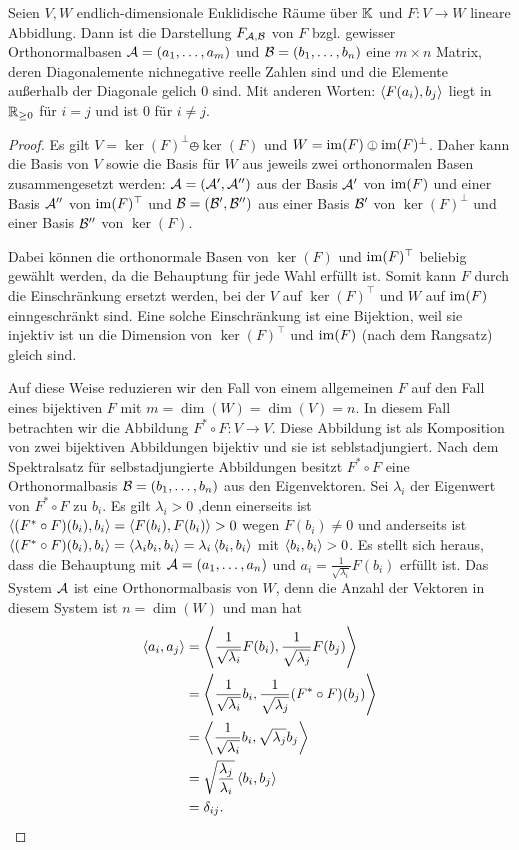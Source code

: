 	\begin{thm}
		Seien $V, W$ endlich-dimensionale Euklidische Räume über $\mathbb K$ und  $F : V \to W$ lineare Abbidlung. Dann ist die Darstellung $F_{\mathcal{A},\mathcal{B}}$ von $F$ bzgl. gewisser Orthonormalbasen $\mathcal{A} = (a_1,\ldots,a_m)$ und $\mathcal{B}= (b_1,\ldots,b_n)$ eine $m \times n$ Matrix, deren Diagonalemente nichnegative reelle Zahlen sind und die Elemente außerhalb der Diagonale gelich $0$ sind. Mit anderen Worten: $\left\langle F(a_i),b_j \right\rangle$ liegt in $\mathbb R_{\ge 0}$ für $i  = j$ und ist $0$ für $i \ne j$. 
	\end{thm}
	\begin{proof}
		Es gilt $V =  \ker(F)^\bot \obot \ker(F)$  und $W = \im(F) \obot \im(F)^\bot$. Daher kann die Basis von $V$ sowie die Basis für $W$ aus jeweils zwei orthonormalen Basen zusammengesetzt werden: $\mathcal{A} = (\mathcal{A}',\mathcal{A}'')$ aus der Basis $\mathcal{A}'$ von $\operatorname{im}(F)$ und einer Basis $\mathcal{A}''$ von $\operatorname{im}(F)^\top$ und $\mathcal{B}=(\mathcal{B}', \mathcal{B}'')$ aus einer Basis $\mathcal{B}'$ von $\ker(F)^\bot$ und einer Basis $\mathcal{B}''$ von $\ker(F)$. 
		
		Dabei können die orthonormale Basen von $\ker(F)$ und $\operatorname{im}(F)^\top$ beliebig gewählt werden, da die Behauptung für jede Wahl erfüllt ist. Somit kann $F$ durch die Einschränkung ersetzt werden, bei der $V$ auf $\ker(F)^\top$ und $W$ auf $\operatorname{im}(F)$ einngeschränkt sind. Eine solche Einschränkung ist eine Bijektion, weil sie injektiv ist un die Dimension von $\ker(F)^\top$ und $\operatorname{im}(F)$ (nach dem Rangsatz) gleich sind. 
		
		Auf diese Weise reduzieren wir den Fall von einem allgemeinen $F$ auf den Fall eines bijektiven $F$ mit $m = \dim(W) = \dim(V) =n$. In diesem Fall betrachten wir die Abbildung $F^\ast \circ F : V \to V$. Diese Abbildung ist als Komposition von zwei bijektiven Abbildungen bijektiv und sie ist seblstadjungiert. Nach dem Spektralsatz für selbstadjungierte Abbildungen besitzt $F^\ast \circ F$ eine Orthonormalbasis $\mathcal{B} = (b_1,\ldots,b_n)$  aus den Eigenvektoren. Sei $\lambda_i$ der Eigenwert von $F^\ast \circ F$ zu $b_i$. Es gilt $\lambda_i> 0$ ,denn einerseits ist $\left\langle  (F^\ast \circ F)(b_i), b_i  \right\rangle = \left\langle  F(b_i), F(b_i) \right\rangle > 0$ wegen $F(b_i) \ne 0$ und anderseits ist $\left\langle  (F^\ast \circ F)(b_i), b_i  \right\rangle = \left\langle \lambda_i b_i , b_i \right\rangle = \lambda_i \left\langle  b_i , b_i \right\rangle$ mit $\left\langle b_i,b_i \right\rangle> 0$. Es stellt  sich heraus, dass die Behauptung mit $\mathcal{A} = (a_1,\ldots,a_n)$ und $a_i = \frac{1}{\sqrt{\lambda_i}} F(b_i)$ erfüllt ist. Das System $\mathcal{A}$ ist eine Orthonormalbasis von $W$, denn die Anzahl der Vektoren in diesem System ist $n=\dim(W)$ und man hat 
		\begin{align*}
			\left\langle  a_i , a_j \right\rangle & = \left\langle  \frac{1}{\sqrt{\lambda_i}} F(b_i) , \frac{1}{\sqrt{\lambda_j}} F(b_j) \right\rangle \\ & = \left\langle  \frac{1}{\sqrt{\lambda_i}} b_i , \frac{1}{\sqrt{\lambda_j}} (F^\ast \circ  F)(b_j) \right\rangle  
			\\ & = \left\langle  \frac{1}{\sqrt{\lambda_i}} b_i , \sqrt{\lambda_j}b_j \right\rangle  
			\\ &  = \sqrt{ \frac{\lambda_j}{\lambda_i} } \left\langle b_i , b_j \right\rangle 
			\\ & = \delta_{ij}. 
		\end{align*}
		

\end{proof}
